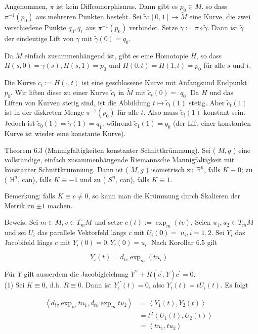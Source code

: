 \documentclass[10pt]{article}
\begin{document}
Angenommen, $\pi$ ist kein Diffeomorphismus. Dann gibt es $p_{0} \in M$, so dass $\pi^{-1}\left(p_{0}\right)$ aus mehreren Punkten besteht. Sei $\tilde{\gamma}:[0,1] \rightarrow \tilde{M}$ eine Kurve, die zwei verschiedene Punkte $q_{0}, q_{1}$ aus $\pi^{-1}\left(p_{0}\right)$ verbindet. Setze $\gamma:=\pi \circ \tilde{\gamma}$. Dann ist $\tilde{\gamma}$ der eindeutige Lift von $\gamma$ mit $\tilde{\gamma}(0)=q_{0}$.

Da $M$ einfach zusammenhängend ist, gibt es eine Homotopie $H$, so dass $H(s, 0)=\gamma(s), H(s, 1)=p_{0}$ und $H(0, t)=H(1, t)=p_{0}$ für alle $s$ und $t$.

Die Kurve $c_{t}:=H(\cdot, t)$ ist eine geschlossene Kurve mit Anfangsund Endpunkt $p_{0}$. Wir liften diese zu einer Kurve $\tilde{c}_{t}$ in $\tilde{M}$ mit $\tilde{c}_{t}(0)=$ $q_{0}$. Da $H$ und das Liften von Kurven stetig sind, ist die Abbildung $t \mapsto \tilde{c}_{t}(1)$ stetig. Aber $\tilde{c}_{t}(1)$ ist in der diskreten Menge $\pi^{-1}\left(p_{0}\right)$ für alle $t$. Also muss $\tilde{c}_{t}(1)$ konstant sein. Jedoch ist $\tilde{c}_{0}(1)=\tilde{\gamma}(1)=q_{1}$, während $\tilde{c}_{1}(1)=q_{0}$ (der Lift einer konstanten Kurve ist wieder eine konstante Kurve).

Theorem 6.3 (Mannigfaltigkeiten konstanter Schnittkrümmung). Sei ( $M, g$ ) eine vollständige, einfach zusammenhängende Riemannsche Mannigfaltigkeit mit konstanter Schnittkrümmung. Dann ist ( $M, g$ ) isometrisch zu $\mathbb{R}^{n}$, falls $K \equiv 0$; zu ( $\mathbb{H}^{n}$, can), falls $K \equiv-1$ und zu ( $S^{n}$, can), falls $K \equiv 1$.

Bemerkung: falls $K \equiv c \neq 0$, so kann man die Krümmung durch Skalieren der Metrik zu $\pm 1$ machen.

Beweis. Sei $m \in M, v \in T_{m} M$ und setze $c(t):=\exp _{m}(t v)$. Seien $u_{1}, u_{2} \in T_{m} M$ und sei $U_{i}$ das parallele Vektorfeld längs $c$ mit $U_{i}(0)=$ $u_{i}, i=1,2$. Sei $Y_{i}$ das Jacobifeld längs $c$ mit $Y_{i}(0)=0, Y_{i}^{\prime}(0)=u_{i}$. Nach Korollar 6.5 gilt

$$
Y_{i}(t)=d_{t v} \exp _{m}\left(t u_{i}\right)
$$

Für $Y$ gilt ausserdem die Jacobigleichung $Y^{\prime \prime}+R\left(c^{\prime}, Y\right) c^{\prime}=0$.\\
(1) Sei $K \equiv 0$, d.h. $R \equiv 0$. Dann ist $Y_{i}^{\prime \prime}(t)=0$, also $Y_{i}(t)=t U_{i}(t)$. Es folgt

$$
\begin{aligned}
\left\langle d_{t v} \exp _{m} t u_{1}, d_{t v} \exp _{m} t u_{2}\right\rangle & =\left\langle Y_{1}(t), Y_{2}(t)\right\rangle \\
& =t^{2}\left\langle U_{1}(t), U_{2}(t)\right\rangle \\
& =\left\langle t u_{1}, t u_{2}\right\rangle
\end{aligned}
$$
\end{document}

